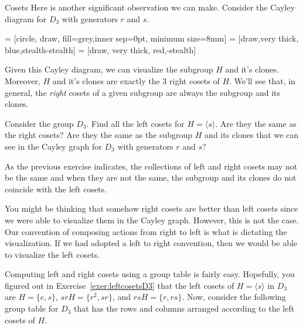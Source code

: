 \begin{section}{Cosets}
Here is another significant observation we can make.  Consider the Cayley diagram for $D_3$ with generators $r$ and $s$.

 = [circle, draw, fill=grey,inner sep=0pt, minimum size=8mm]
 = [draw,very  thick, blue,stealth-stealth]
 = [draw, very thick, red,-stealth]

\begin{center}
\end{center}
Given this Cayley diagram, we can visualize the subgroup $H$ and it's clones.  Moreover, $H$ and it's clones are exactly the 3 right cosets of $H$.  We'll see that, in general, the \emph{right} cosets of a given subgroup are always the subgroup and its clones.

\begin{exercise}\label{exer:leftcosetsD3}
Consider the group $D_3$.  Find all the left cosets for $H=\langle s\rangle$.  Are they the same as the right cosets?  Are they the same as the subgroup $H$ and its clones that we can see in the Cayley graph for $D_3$ with generators $r$ and $s$?
\end{exercise}

As the previous exercise indicates, the collections of left and right cosets may not be the same and when they are not the same, the subgroup and its clones do not coincide with the left cosets.

You might be thinking that somehow right cosets are better than left cosets since we were able to visualize them in the Cayley graph.  However, this is not the case.  Our convention of composing actions from right to left is what is dictating the visualization.  If we had adopted a left to right convention, then we would be able to visualize the left cosets.  

Computing left and right cosets using a group table is fairly easy.  Hopefully, you figured out in Exercise~\ref{exer:leftcosetsD3} that the left cosets of $H=\langle s\rangle$ in $D_3$ are $H=\{e,s\}$, $srH=\{r^2,sr\}$, and $rsH=\{r,rs\}$.  Now, consider the following group table for $D_3$ that has the rows and columns arranged according to the left cosets of $H$.


\end{section}
